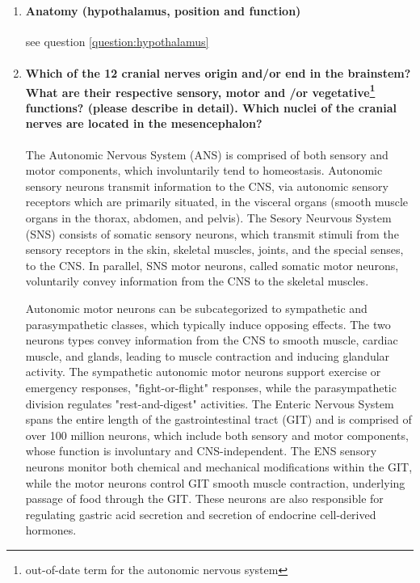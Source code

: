 \documentclass[12pt,article,oneside,a4paper]{memoir}
\begin{document}
\begin{enumerate}
\item \paragraph{Anatomy (hypothalamus, position and function)}
see question \ref{question:hypothalamus}

\item \paragraph{Which of the 12 cranial nerves origin and/or end in the brainstem? What are their respective sensory, motor and /or vegetative\protect\footnote{out-of-date term for the autonomic nervous system} functions? (please describe in detail). Which nuclei of the cranial nerves are located in the mesencephalon?}

The Autonomic Nervous System (ANS) is comprised of both sensory and motor components, which involuntarily tend to homeostasis. Autonomic sensory neurons transmit information to the CNS, via autonomic sensory receptors which are primarily situated, in the visceral organs (smooth muscle organs in the thorax, abdomen, and pelvis). The Sesory Neurvous System (SNS) consists of somatic sensory neurons, which transmit stimuli from the sensory receptors in the skin, skeletal muscles, joints, and the special senses, to the CNS. In parallel, SNS motor neurons, called somatic motor neurons, voluntarily convey information from the CNS to the skeletal muscles.  

Autonomic motor neurons can be subcategorized to sympathetic and parasympathetic classes, which typically induce opposing effects. The two neurons types convey information from the CNS to smooth muscle, cardiac muscle, and glands, leading to muscle contraction and inducing glandular activity. The sympathetic autonomic motor neurons support exercise or emergency responses, "fight-or-flight" responses, while the parasympathetic division regulates "rest-and-digest" activities.
The Enteric Nervous System spans the entire length of the gastrointestinal tract (GIT) and is comprised of over 100 million neurons, which include both sensory and motor components, whose function is involuntary and CNS-independent. The ENS sensory neurons monitor both chemical and mechanical modifications within the GIT, while the motor neurons control GIT smooth muscle contraction, underlying passage of food through the GIT. These neurons are also responsible for regulating gastric acid secretion and secretion of endocrine cell-derived hormones.


\end{enumerate}
\end{document}
